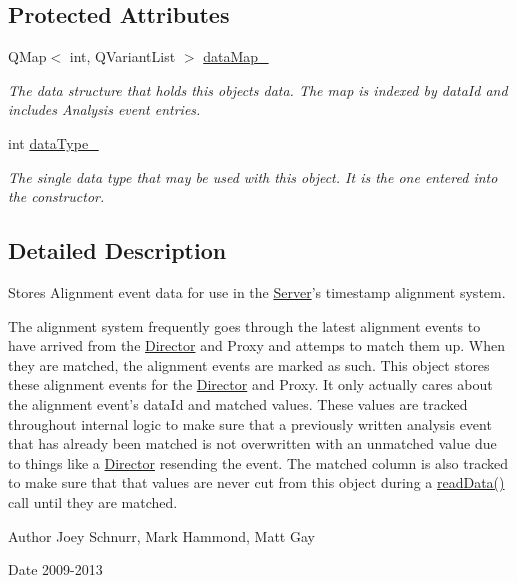 \subsection*{Protected Attributes}
\begin{DoxyCompactItemize}
\item 
\hypertarget{class_align_session_data_a2a90bcb0469c0621b1b14e7eb01af9b2}{Q\-Map$<$ int, Q\-Variant\-List $>$ \hyperlink{class_align_session_data_a2a90bcb0469c0621b1b14e7eb01af9b2}{data\-Map\-\_\-}}\label{class_align_session_data_a2a90bcb0469c0621b1b14e7eb01af9b2}

\begin{DoxyCompactList}\small\item\em The data structure that holds this objects data. The map is indexed by data\-Id and includes Analysis event entries. \end{DoxyCompactList}\item 
\hypertarget{class_align_session_data_a0ba990a6ecab63b663c51958a36c17d5}{int \hyperlink{class_align_session_data_a0ba990a6ecab63b663c51958a36c17d5}{data\-Type\-\_\-}}\label{class_align_session_data_a0ba990a6ecab63b663c51958a36c17d5}

\begin{DoxyCompactList}\small\item\em The single data type that may be used with this object. It is the one entered into the constructor. \end{DoxyCompactList}\end{DoxyCompactItemize}


\subsection{Detailed Description}
Stores Alignment event data for use in the \hyperlink{class_server}{Server}'s timestamp alignment system. 

The alignment system frequently goes through the latest alignment events to have arrived from the \hyperlink{class_director}{Director} and Proxy and attemps to match them up. When they are matched, the alignment events are marked as such. This object stores these alignment events for the \hyperlink{class_director}{Director} and Proxy. It only actually cares about the alignment event's data\-Id and matched values. These values are tracked throughout internal logic to make sure that a previously written analysis event that has already been matched is not overwritten with an unmatched value due to things like a \hyperlink{class_director}{Director} resending the event. The matched column is also tracked to make sure that that values are never cut from this object during a \hyperlink{class_align_session_data_a88815e5e509175a5a7c1851a9a012c88}{read\-Data()} call until they are matched. \begin{DoxyAuthor}{Author}
Joey Schnurr, Mark Hammond, Matt Gay 
\end{DoxyAuthor}
\begin{DoxyDate}{Date}
2009-\/2013 
\end{DoxyDate}


